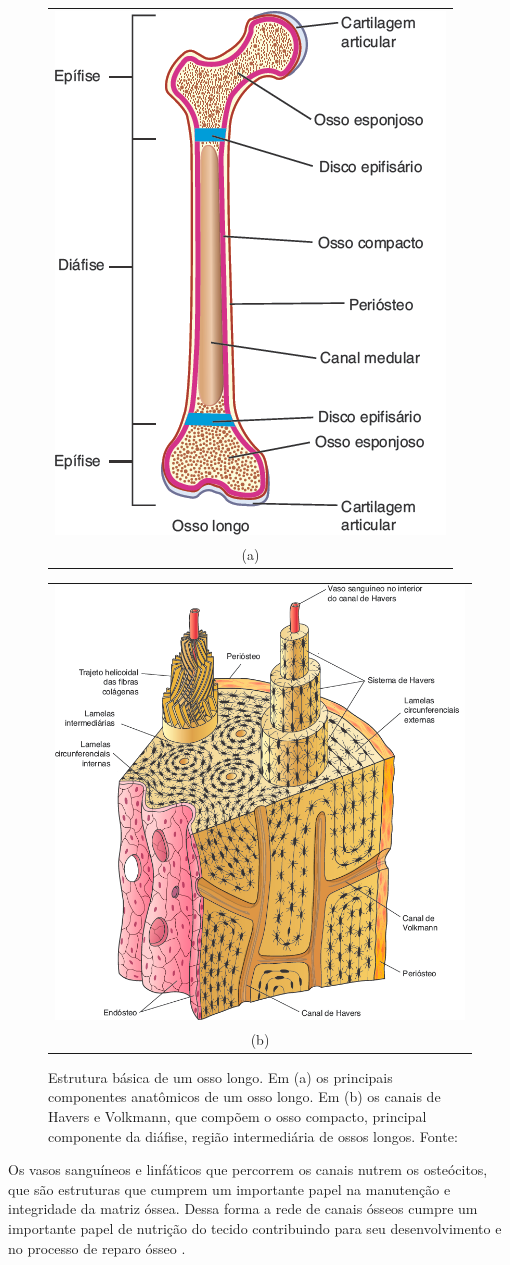 \begin{figure}[H]
    \centering
    \center
    \begin{tabular}{@{}c@{}}
        \includegraphics[width=.4\linewidth]{figures/2_theoric_foundamentations/estruturaosso.png}
        \\[\abovecaptionskip]
        \small (a)
    \end{tabular}
    \begin{tabular}{@{}c@{}}
        \includegraphics[width=.4\linewidth]{figures/2_theoric_foundamentations/sistemahavers.png}
        \\[\abovecaptionskip]
        \small (b)
    \end{tabular}
  
    \caption[Estrutura básica de um osso longo.]{Estrutura básica de um osso longo. Em (a) os principais componentes anatômicos de um osso longo. Em (b) os canais de Havers e Volkmann, que compõem o osso compacto, principal componente da diáfise, região intermediária de ossos longos. Fonte: \cite{junqueira1985histologia}}
    \label{fig:estrutura-ossos-longos}
\end{figure}

Os vasos sanguíneos e linfáticos que percorrem os canais nutrem os osteócitos, que são estruturas que cumprem um importante papel na manutenção e integridade da matriz óssea. Dessa forma a rede de canais ósseos cumpre um importante papel de nutrição do tecido contribuindo para seu desenvolvimento e no processo de reparo ósseo \cite{junqueira1985histologia}.

